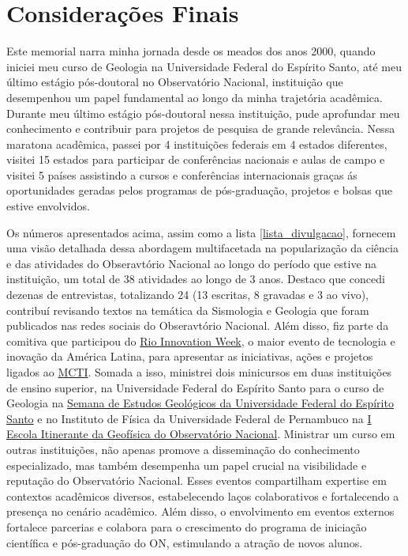 \documentclass[10pt,a4paper,oneside]{book}
\begin{document}

\chapter{Considerações Finais}
\label{cap_conclusao}

Este memorial narra minha jornada desde os meados dos anos 2000, quando iniciei meu curso de Geologia na Universidade Federal do Espírito Santo, até meu último estágio pós-doutoral no Observatório Nacional, instituição que desempenhou um papel fundamental ao longo da minha trajetória acadêmica. Durante meu último estágio pós-doutoral nessa instituição, pude aprofundar meu conhecimento e contribuir para projetos de pesquisa de grande relevância. Nessa maratona acadêmica, passei por 4 instituições federais em 4 estados diferentes, visitei 15 estados para participar de conferências nacionais e aulas de campo e visitei 5 países assistindo a cursos e conferências internacionais graças ás oportunidades geradas pelos programas de pós-graduação, projetos e bolsas que estive envolvidos.

Os números apresentados acima, assim como a lista \ref{lista_divulgacao}, fornecem uma visão detalhada dessa abordagem multifacetada na popularização da ciência e das atividades do Obseravtório Nacional ao longo do período que estive na instituição, um total de 38 atividades ao longo de 3 anos. Destaco que concedi dezenas de entrevistas, totalizando 24 (13 escritas, 8 gravadas e 3 ao vivo), contribuí revisando textos na temática da Sismologia e Geologia que foram publicados nas redes sociais do Obseravtório Nacional. Além disso, fiz parte da comitiva que participou do \href{https://www.gov.br/observatorio/pt-br/assuntos/areas-de-atuacao/divulgacao-e-popularizacao-da-ciencia/on-riw}{Rio Innovation Week}, o maior evento de tecnologia e inovação da América Latina, para apresentar as iniciativas, ações e projetos ligados ao \href{https://www.gov.br/mcti/pt-br}{MCTI}. Somada a isso, ministrei dois minicursos em duas instituições de ensino superior, na Universidade Federal do Espírito Santo para o curso de Geologia na \href{https://www.instagram.com/segeo.ufes/}{Semana de Estudos Geológicos da Universidade Federal do Espírito Santo} e no Instituto de Física da Universidade Federal de Pernambuco na \href{https://www.gov.br/observatorio/pt-br/assuntos/noticias/i-escola-itinerante-da-geofisica-do-observatorio-nacional-e-realizada-na-ufpe}{I Escola Itinerante da Geofísica do Observatório Nacional}. Ministrar um curso em outras instituições, não apenas promove a disseminação do conhecimento especializado, mas também desempenha um papel crucial na visibilidade e reputação do Observatório Nacional. Esses eventos compartilham expertise em contextos acadêmicos diversos, estabelecendo laços colaborativos e fortalecendo a presença no cenário acadêmico. Além disso, o envolvimento em eventos externos fortalece parcerias e colabora para o crescimento do programa de iniciação científica e pós-graduação do ON, estimulando a atração de novos alunos.
\end{document}
